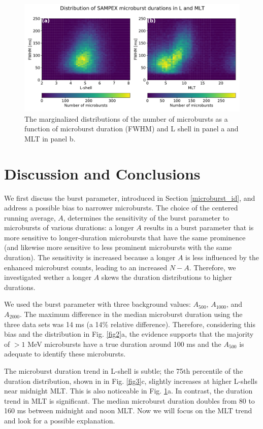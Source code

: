 \documentclass[draft]{agujournal2019}
\begin{document}
\begin{figure}
\noindent\includegraphics[width=\textwidth]{figures/fig4.pdf}
\caption{The marginalized distributions of the number of microbursts as a function of microburst duration (FWHM) and L shell in panel a and MLT in panel b.}
\label{fig4}
\end{figure}

\section{Discussion and Conclusions}\label{discussion}
We first discuss the burst parameter, introduced in Section \ref{microburst_id}, and address a possible bias to narrower microbursts. The choice of the centered running average, $A$, determines the sensitivity of the burst parameter to microbursts of various durations: a longer $A$ results in a burst parameter that is more sensitive to longer-duration microbursts that have the same prominence (and likewise more sensitive to less prominent microbursts with the same duration). The sensitivity is increased because a longer $A$ is less influenced by the enhanced microburst counts, leading to an increased $N-A$. Therefore, we investigated wether a longer $A$ skews the duration distributions to higher durations.

We used the burst parameter with three background values: $A_{500}$, $A_{1000}$, and $A_{2000}$. The maximum difference in the median microburst duration using the three data sets was 14 ms (a 14\% relative difference). Therefore, considering this bias and the distribution in Fig. \ref{fig2}a, the evidence supports that the majority of $>1$ MeV microbursts have a true duration around 100 ms and the $A_{500}$ is adequate to identify these microbursts.

The microburst duration trend in L-shell is subtle; the 75th percentile of the duration distribution, shown in in Fig. \ref{fig3}c, slightly increases at higher L-shells near midnight MLT. This is also noticeable in Fig. \ref{fig4}a. In contrast, the duration trend in MLT is significant. The median microburst duration doubles from 80 to 160 ms between midnight and noon MLT. Now we will focus on the MLT trend and look for a possible explanation.
\end{document}
